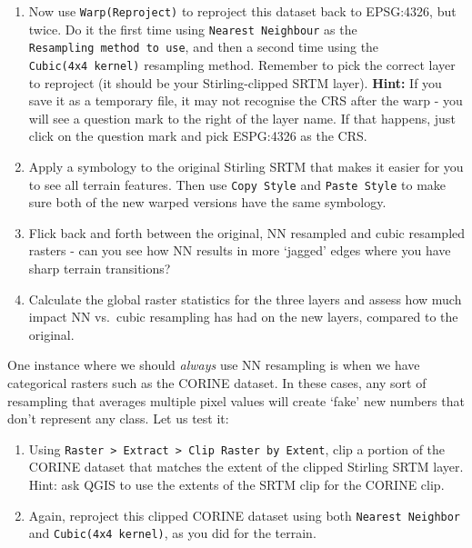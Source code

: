 \documentclass[
  letterpaper,
  DIV=11,
  numbers=noendperiod]{scrreprt}
\begin{document}
\begin{enumerate}
\def\labelenumi{\arabic{enumi}.}
\setcounter{enumi}{1}
\item
  Now use \texttt{Warp(Reproject)} to reproject this dataset back to
  EPSG:4326, but twice. Do it the first time using
  \texttt{Nearest\ Neighbour} as the
  \texttt{Resampling\ method\ to\ use}, and then a second time using the
  \texttt{Cubic(4x4\ kernel)} resampling method. Remember to pick the
  correct layer to reproject (it should be your Stirling-clipped SRTM
  layer). \textbf{Hint:} If you save it as a temporary file, it may not
  recognise the CRS after the warp - you will see a question mark to the
  right of the layer name. If that happens, just click on the question
  mark and pick ESPG:4326 as the CRS.
\item
  Apply a symbology to the original Stirling SRTM that makes it easier
  for you to see all terrain features. Then use \texttt{Copy\ Style} and
  \texttt{Paste\ Style} to make sure both of the new warped versions
  have the same symbology.
\item
  Flick back and forth between the original, NN resampled and cubic
  resampled rasters - can you see how NN results in more `jagged' edges
  where you have sharp terrain transitions?
\item
  Calculate the global raster statistics for the three layers and assess
  how much impact NN vs.~cubic resampling has had on the new layers,
  compared to the original.
\end{enumerate}

One instance where we should \emph{always} use NN resampling is when we
have categorical rasters such as the CORINE dataset. In these cases, any
sort of resampling that averages multiple pixel values will create
`fake' new numbers that don't represent any class. Let us test it:

\begin{enumerate}
\def\labelenumi{\arabic{enumi}.}
\setcounter{enumi}{5}
\item
  Using
  \texttt{Raster\ \textgreater{}\ Extract\ \textgreater{}\ Clip\ Raster\ by\ Extent},
  clip a portion of the CORINE dataset that matches the extent of the
  clipped Stirling SRTM layer. Hint: ask QGIS to use the extents of the
  SRTM clip for the CORINE clip.
\item
  Again, reproject this clipped CORINE dataset using both
  \texttt{Nearest\ Neighbor} and \texttt{Cubic(4x4\ kernel)}, as you did
  for the terrain.
\end{enumerate}
\end{document}

